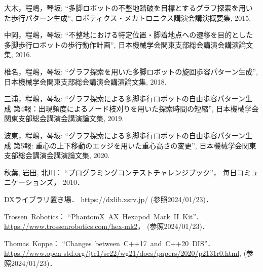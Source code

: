 \begin{thebibliography}{99}
    大木，程嶋，琴坂: 
    ``多脚ロボットの不整地踏破を目標とするグラフ探索を用いた歩行パターン生成'', 
    ロボティクス・メカトロニクス講演会講演概要集,
    2015.   

    中岡，程嶋，琴坂: 
    ``不整地における特定位置・脚着地点への遷移を目的とした多脚歩行ロボットの歩行動作計画'',
    日本機械学会関東支部総会講演会講演論文集,
    2016.

    椎名，程嶋，琴坂: 
    ``グラフ探索を用いた多脚ロボットの旋回歩容パターン生成'',
    日本機械学会関東支部総会講演会講演論文集,
    2018.

    三浦，程嶋，琴坂: 
    ``グラフ探索による多脚歩行ロボットの自由歩容パターン生成 第4報：出現頻度によるノード枝刈りを用いた探索時間の短縮'',
    日本機械学会関東支部総会講演会講演論文集,
    2019.

    波東，程嶋，琴坂: 
    ``グラフ探索による多脚歩行ロボットの自由歩容パターン生成 第5報: 重心の上下移動のエッジを用いた重心高さの変更'',
    日本機械学会関東支部総会講演会講演論文集,
    2020.

    秋葉, 岩田, 北川：
    ``プログラミングコンテストチャレンジブック''，
    毎日コミュニケーションズ，
    2010．
    
    DXライブラリ置き場．
    https://dxlib.xsrv.jp/ (参照2024/01/23)．

    Trossen~Robotics：
    ``PhantomX~AX~Hexapod~Mark~II~Kit''．
    \url{https://www.trossenrobotics.com/hex-mk2}，
    (参照2024/01/23)．

    Thomas~Koppe：
    ``Changes~between~C++17~and~C++20~DIS''．
    \url{https://www.open-std.org/jtc1/sc22/wg21/docs/papers/2020/p2131r0.html}, 
    (参照2024/01/23)．


\end{thebibliography}
\endinput